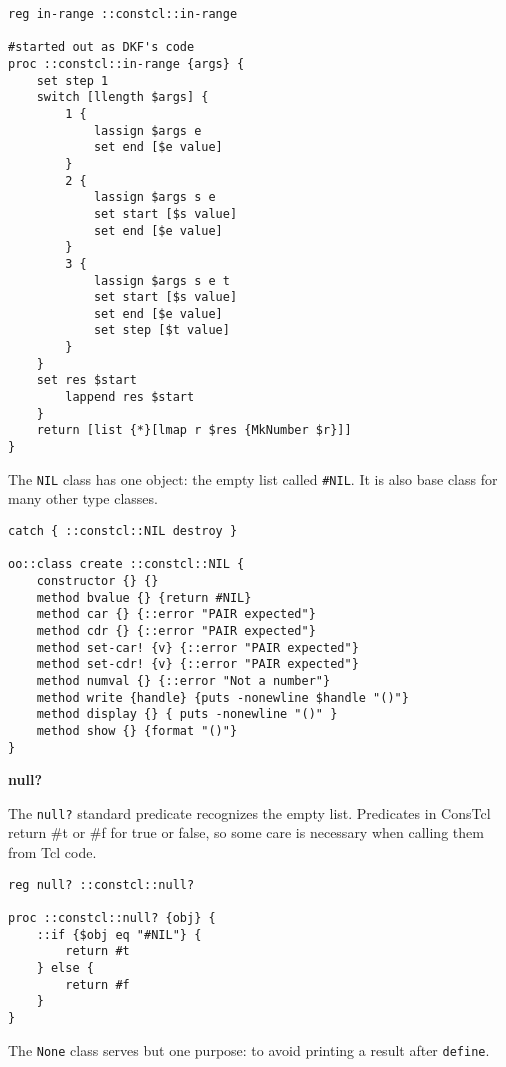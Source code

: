\documentclass{report}
\begin{document}
\noindent\makebox[\linewidth]{\rule{\linewidth}{0.4pt}}
\begin{lstlisting}
reg in-range ::constcl::in-range
 
#started out as DKF's code
proc ::constcl::in-range {args} {
    set step 1
    switch [llength $args] {
        1 {
            lassign $args e
            set end [$e value]
        }
        2 {
            lassign $args s e
            set start [$s value]
            set end [$e value]
        }
        3 {
            lassign $args s e t
            set start [$s value]
            set end [$e value]
            set step [$t value]
        }
    }
    set res $start
        lappend res $start
    }
    return [list {*}[lmap r $res {MkNumber $r}]]
}
\end{lstlisting}
\noindent\makebox[\linewidth]{\rule{\linewidth}{0.4pt}}

The \texttt{NIL} class has one object: the empty list called \texttt{\#NIL}. It is also base class for many other type classes.

\noindent\makebox[\linewidth]{\rule{\linewidth}{0.4pt}}
\begin{lstlisting}
catch { ::constcl::NIL destroy }
 
oo::class create ::constcl::NIL {
    constructor {} {}
    method bvalue {} {return #NIL}
    method car {} {::error "PAIR expected"}
    method cdr {} {::error "PAIR expected"}
    method set-car! {v} {::error "PAIR expected"}
    method set-cdr! {v} {::error "PAIR expected"}
    method numval {} {::error "Not a number"}
    method write {handle} {puts -nonewline $handle "()"}
    method display {} { puts -nonewline "()" }
    method show {} {format "()"}
}
\end{lstlisting}
\noindent\makebox[\linewidth]{\rule{\linewidth}{0.4pt}}

\textbf{null?}


The \texttt{null?} standard predicate recognizes the empty list. Predicates in ConsTcl return \#t or \#f for true or false, so some care is necessary when calling them from Tcl code.

\noindent\makebox[\linewidth]{\rule{\linewidth}{0.4pt}}
\begin{lstlisting}
reg null? ::constcl::null?
 
proc ::constcl::null? {obj} {
    ::if {$obj eq "#NIL"} {
        return #t
    } else {
        return #f
    }
}
\end{lstlisting}
\noindent\makebox[\linewidth]{\rule{\linewidth}{0.4pt}}

The \texttt{None} class serves but one purpose: to avoid printing a result after \texttt{define}.
\end{document}
